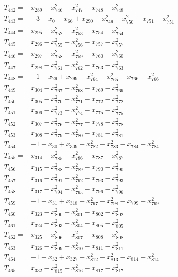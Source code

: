 \begin{align*}
T_{442}={}&x_{289}-x_{746}^{2}-x_{747}^{2}-x_{748}-x_{748}^{2}\\[3pt]
T_{443}={}&-3-x_{0}-x_{66}+x_{290}-x_{749}^{2}-x_{750}^{2}-x_{751}-x_{751}^{2}\\[3pt]
T_{444}={}&x_{295}-x_{752}^{2}-x_{753}^{2}-x_{754}-x_{754}^{2}\\[3pt]
T_{445}={}&x_{296}-x_{755}^{2}-x_{756}^{2}-x_{757}-x_{757}^{2}\\[3pt]
T_{446}={}&x_{297}-x_{758}^{2}-x_{759}^{2}-x_{760}-x_{760}^{2}\\[3pt]
T_{447}={}&x_{298}-x_{761}^{2}-x_{762}^{2}-x_{763}-x_{763}^{2}\\[3pt]
T_{448}={}&-1-x_{29}+x_{299}-x_{764}^{2}-x_{765}^{2}-x_{766}-x_{766}^{2}\\[3pt]
T_{449}={}&x_{304}-x_{767}^{2}-x_{768}^{2}-x_{769}-x_{769}^{2}\\[3pt]
T_{450}={}&x_{305}-x_{770}^{2}-x_{771}^{2}-x_{772}-x_{772}^{2}\\[3pt]
T_{451}={}&x_{306}-x_{773}^{2}-x_{774}^{2}-x_{775}-x_{775}^{2}\\[3pt]
T_{452}={}&x_{307}-x_{776}^{2}-x_{777}^{2}-x_{778}-x_{778}^{2}\\[3pt]
T_{453}={}&x_{308}-x_{779}^{2}-x_{780}^{2}-x_{781}-x_{781}^{2}\\[3pt]
T_{454}={}&-1-x_{30}+x_{309}-x_{782}^{2}-x_{783}^{2}-x_{784}-x_{784}^{2}\\[3pt]
T_{455}={}&x_{314}-x_{785}^{2}-x_{786}^{2}-x_{787}-x_{787}^{2}\\[3pt]
T_{456}={}&x_{315}-x_{788}^{2}-x_{789}^{2}-x_{790}-x_{790}^{2}\\[3pt]
T_{457}={}&x_{316}-x_{791}^{2}-x_{792}^{2}-x_{793}-x_{793}^{2}\\[3pt]
T_{458}={}&x_{317}-x_{794}^{2}-x_{795}^{2}-x_{796}-x_{796}^{2}\\[3pt]
T_{459}={}&-1-x_{31}+x_{318}-x_{797}^{2}-x_{798}^{2}-x_{799}-x_{799}^{2}\\[3pt]
T_{460}={}&x_{323}-x_{800}^{2}-x_{801}^{2}-x_{802}-x_{802}^{2}\\[3pt]
T_{461}={}&x_{324}-x_{803}^{2}-x_{804}^{2}-x_{805}-x_{805}^{2}\\[3pt]
T_{462}={}&x_{325}-x_{806}^{2}-x_{807}^{2}-x_{808}-x_{808}^{2}\\[3pt]
T_{463}={}&x_{326}-x_{809}^{2}-x_{810}^{2}-x_{811}-x_{811}^{2}\\[3pt]
T_{464}={}&-1-x_{32}+x_{327}-x_{812}^{2}-x_{813}^{2}-x_{814}-x_{814}^{2}\\[3pt]
T_{465}={}&x_{332}-x_{815}^{2}-x_{816}^{2}-x_{817}-x_{817}^{2}\\[3pt]

\end{align*}
